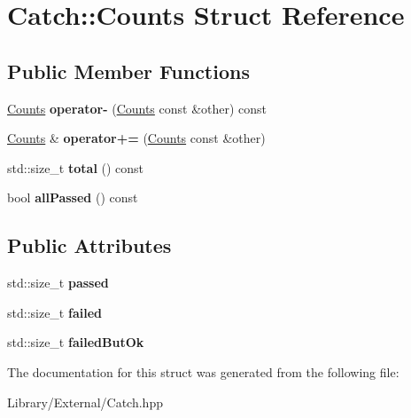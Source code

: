 \hypertarget{struct_catch_1_1_counts}{}\section{Catch\+:\+:Counts Struct Reference}
\label{struct_catch_1_1_counts}
\subsection*{Public Member Functions}
\begin{DoxyCompactItemize}
\item 
\hypertarget{struct_catch_1_1_counts_aedf86fefe33938d132a6981171cd83e6}{}\hyperlink{struct_catch_1_1_counts}{Counts} {\bfseries operator-\/} (\hyperlink{struct_catch_1_1_counts}{Counts} const \&other) const \label{struct_catch_1_1_counts_aedf86fefe33938d132a6981171cd83e6}

\item 
\hypertarget{struct_catch_1_1_counts_a322a89475cd2cc039140ef371e973677}{}\hyperlink{struct_catch_1_1_counts}{Counts} \& {\bfseries operator+=} (\hyperlink{struct_catch_1_1_counts}{Counts} const \&other)\label{struct_catch_1_1_counts_a322a89475cd2cc039140ef371e973677}

\item 
\hypertarget{struct_catch_1_1_counts_a9125c662e30114e5c5cc94729b1e9e84}{}std\+::size\+\_\+t {\bfseries total} () const \label{struct_catch_1_1_counts_a9125c662e30114e5c5cc94729b1e9e84}

\item 
\hypertarget{struct_catch_1_1_counts_adbbaca552f6017ce69e0d5dc5500bea4}{}bool {\bfseries all\+Passed} () const \label{struct_catch_1_1_counts_adbbaca552f6017ce69e0d5dc5500bea4}

\end{DoxyCompactItemize}
\subsection*{Public Attributes}
\begin{DoxyCompactItemize}
\item 
\hypertarget{struct_catch_1_1_counts_ad28daaf3de28006400208b6dd0c631e6}{}std\+::size\+\_\+t {\bfseries passed}\label{struct_catch_1_1_counts_ad28daaf3de28006400208b6dd0c631e6}

\item 
\hypertarget{struct_catch_1_1_counts_a19982a3817a3bc2c07f0290e71f497a3}{}std\+::size\+\_\+t {\bfseries failed}\label{struct_catch_1_1_counts_a19982a3817a3bc2c07f0290e71f497a3}

\item 
\hypertarget{struct_catch_1_1_counts_ac090973a2ff51394cd452718e75c073e}{}std\+::size\+\_\+t {\bfseries failed\+But\+Ok}\label{struct_catch_1_1_counts_ac090973a2ff51394cd452718e75c073e}

\end{DoxyCompactItemize}


The documentation for this struct was generated from the following file\+:\begin{DoxyCompactItemize}
\item 
Library/\+External/Catch.\+hpp\end{DoxyCompactItemize}
